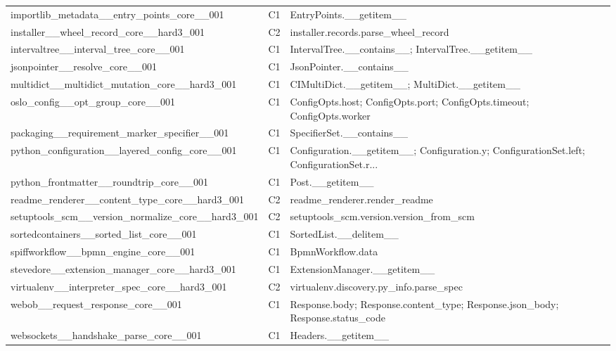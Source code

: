 \begin{longtable}{llp{}}
importlib\_metadata\_\_entry\_points\_core\_\_001 & C1 & EntryPoints.\_\_getitem\_\_ \\
installer\_\_wheel\_record\_core\_\_hard3\_001 & C2 & installer.records.parse\_wheel\_record \\
intervaltree\_\_interval\_tree\_core\_\_001 & C1 & IntervalTree.\_\_contains\_\_; IntervalTree.\_\_getitem\_\_ \\
jsonpointer\_\_resolve\_core\_\_001 & C1 & JsonPointer.\_\_contains\_\_ \\
multidict\_\_multidict\_mutation\_core\_\_hard3\_001 & C1 & CIMultiDict.\_\_getitem\_\_; MultiDict.\_\_getitem\_\_ \\
oslo\_config\_\_opt\_group\_core\_\_001 & C1 & ConfigOpts.host; ConfigOpts.port; ConfigOpts.timeout; ConfigOpts.worker \\
packaging\_\_requirement\_marker\_specifier\_\_001 & C1 & SpecifierSet.\_\_contains\_\_ \\
python\_configuration\_\_layered\_config\_core\_\_001 & C1 & Configuration.\_\_getitem\_\_; Configuration.y; ConfigurationSet.left; ConfigurationSet.r... \\
python\_frontmatter\_\_roundtrip\_core\_\_001 & C1 & Post.\_\_getitem\_\_ \\
readme\_renderer\_\_content\_type\_core\_\_hard3\_001 & C2 & readme\_renderer.render\_readme \\
setuptools\_scm\_\_version\_normalize\_core\_\_hard3\_001 & C2 & setuptools\_scm.version.version\_from\_scm \\
sortedcontainers\_\_sorted\_list\_core\_\_001 & C1 & SortedList.\_\_delitem\_\_ \\
spiffworkflow\_\_bpmn\_engine\_core\_\_001 & C1 & BpmnWorkflow.data \\
stevedore\_\_extension\_manager\_core\_\_hard3\_001 & C1 & ExtensionManager.\_\_getitem\_\_ \\
virtualenv\_\_interpreter\_spec\_core\_\_hard3\_001 & C2 & virtualenv.discovery.py\_info.parse\_spec \\
webob\_\_request\_response\_core\_\_001 & C1 & Response.body; Response.content\_type; Response.json\_body; Response.status\_code \\
websockets\_\_handshake\_parse\_core\_\_001 & C1 & Headers.\_\_getitem\_\_ \\
\bottomrule
\end{longtable}
